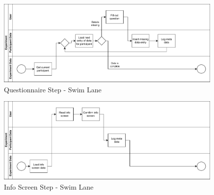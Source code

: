 



\begin{figure}[]
    \centering
    \includegraphics[width=0.99\textwidth, keepaspectratio]{content/05_design_and_dev_artefacts/QuestionairSwimLane.drawio.pdf}
    \caption{Questionnaire Step - Swim Lane}    
    \label{fig:questionairSwimLane}
\end{figure}




\begin{figure}[]
    \centering
    \includegraphics[width=0.99\textwidth, keepaspectratio]{content/05_design_and_dev_artefacts/InfoScreenSwimLane.drawio.pdf}
    \caption{Info Screen Step - Swim Lane}    
    \label{fig:infoScreenSwimLane}
\end{figure}



